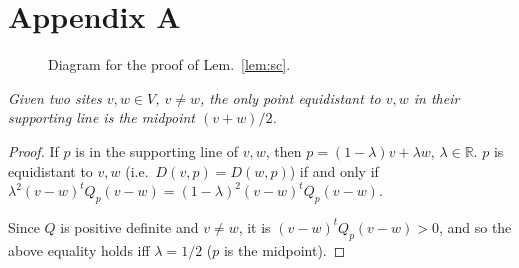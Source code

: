 \documentclass[11pt]{article}
\begin{document}
\newpage
\section*{Appendix A}\label{app:prelim}

\begin{figure}[ht]
\centering
{}
\label{fig:sc}
\caption{Diagram for the proof of Lem.~\ref{lem:sc}.}
\end{figure}


\emph{Given two sites $v,w\in V$, $v\ne w$, the only point equidistant to $v,w$ in their supporting line is the midpoint $(v+w)/2$. }
\begin{proof}
If $p$ is in the supporting line of $v,w$, then $p=(1-\lambda)v+\lambda w$, $\lambda\in\mathbb{R}$. 
	$p$ is equidistant to $v,w$ (i.e.\ $D(v,p)=D(w,p)$) if and only if
		$\lambda^2 (v-w)^t Q_p (v-w) = (1-\lambda)^2 (v-w)^t Q_p (v-w)$.

	Since $Q$ is positive definite and $v\ne w$, it is $(v-w)^t Q_p (v-w) > 0$, 
	and so the above equality holds iff $\lambda=1/2$ ($p$ is the midpoint).
\end{proof}
\end{document}

